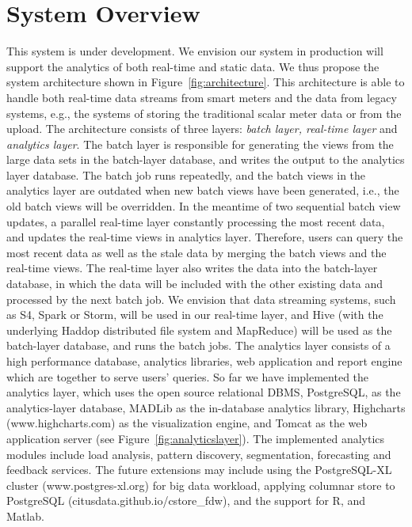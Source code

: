 \documentclass{sig-alternate}
\newcommand{\ie}{i.e.}
\newcommand{\eg}{e.g.}
\begin{document}
\section{System Overview}
This system is under development. We envision our system in production will support the analytics of both real-time and static data. We thus propose the system architecture shown in Figure~\ref{fig:architecture}.   This architecture is able to handle both real-time data streams from smart meters and the data from legacy systems, \eg, the systems of storing the traditional scalar meter data or from the upload. The architecture consists of three layers: {\em batch layer,  real-time layer} and {\em analytics layer}.  The batch layer is responsible for generating the views from the large data sets in the batch-layer database, and writes the output to the analytics layer database. The batch job runs repeatedly, and the batch views in the analytics layer are outdated when new batch views have been generated, \ie, the old batch views will be overridden. In the meantime of two sequential batch view updates, a parallel real-time layer constantly processing the most recent data, and updates the real-time views in analytics layer. Therefore, users can query the most recent data as well as the stale data by merging the batch views and the real-time views. The real-time layer also writes the data into the batch-layer database, in which the data will be included with the other existing data and processed by the next batch job. We envision that data streaming systems, such as S4, Spark or Storm, will be used in our real-time layer, and Hive (with the underlying Haddop distributed file system and MapReduce) will be used as the batch-layer database, and runs the batch jobs.  The analytics layer consists of a high performance database, analytics libraries, web application and report engine which are together to serve users' queries. So far we have implemented the analytics layer, which uses the open source relational DBMS, PostgreSQL, as the analytics-layer database,  MADLib \cite{madlib} as the in-database analytics library, Highcharts (www.highcharts.com) as the visualization engine, and Tomcat as the web application server (see Figure~\ref{fig:analyticslayer}). The implemented analytics modules include load analysis, pattern discovery, segmentation, forecasting and feedback services. The future extensions  may include using the PostgreSQL-XL cluster (www.postgres-xl.org) for  big data workload,  applying columnar store to PostgreSQL (citusdata.github.io/cstore\_fdw), and the support for R, and Matlab. 
\end{document}
